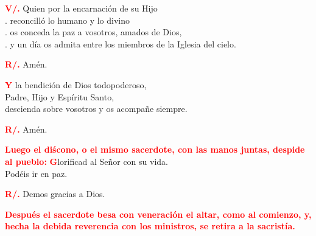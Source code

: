 \documentclass[12pt, letterpaper]{report}
\begin{document}
  \Large \hspace{-0.9cm} {\bfseries \textcolor{red}{V/.}} \hspace{0.5cm} Quien por la encarnaci\'on de su Hijo \\
  . \hspace{1cm} reconcill\'o lo humano y lo divino \\
  . \hspace{1cm} os conceda la paz a vosotros, amados de Dios, \\
  . \hspace{1cm} y un d\'ia os admita entre los miembros de la Iglesia del cielo.

  \Large \hspace{-0.9cm} {\bfseries \textcolor{red}{R/.}} \hspace{0.5cm} Am\'en.

  \lettrine[lines=2]{\bfseries \textcolor{red}{Y}}{} \Large la bendici\'on de Dios todopoderoso, \\
  Padre, Hijo \Huge{\textcolor{red}{}} \Large y Esp\'iritu Santo, \\
  descienda sobre vosotros y os acompa\~ne siempre.

  \Large \hspace{-0.9cm} {\bfseries \textcolor{red}{R/.}} \hspace{0.5cm} Am\'en.

  \large{\bfseries \textcolor{red}{Luego el di\'scono, o el mismo sacerdote, con las manos juntas, despide al pueblo:}}
  \lettrine[lines=2]{\bfseries \textcolor{red}{G}}{}\Large lorificad al Se\~nor con su vida. \\
  Pod\'eis ir en paz.

  \Large \hspace{-0.9cm} {\bfseries \textcolor{red}{R/.}} \hspace{0.5cm} Demos gracias a Dios.

  \large{\bfseries \textcolor{red}{Despu\'es el sacerdote besa con veneraci\'on el altar, como al comienzo, y, hecha la debida reverencia con los ministros, se retira a la sacrist\'ia.}}
\end{document}
